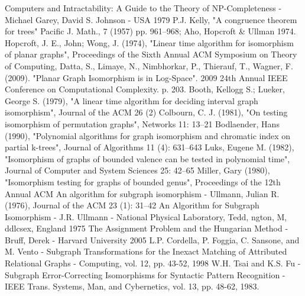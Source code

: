 \documentclass[a4paper,12pt,twoside]{article}
\begin{document}
\begin{thebibliography}{1}
 Computers and Intractability: A Guide to the Theory of NP-Completeness - Michael Garey, David S. Johnson - USA 1979
 P.J. Kelly, "A congruence theorem for trees" Pacific J. Math., 7 (1957) pp. 961–968; Aho, Hopcroft & Ullman 1974.
 Hopcroft, J. E., John; Wong, J. (1974), "Linear time algorithm for isomorphism of planar graphs", Proceedings of the Sixth Annual ACM Symposium on Theory of Computing, 
 Datta, S., Limaye, N., Nimbhorkar, P., Thierauf, T., Wagner, F. (2009). "Planar Graph Isomorphism is in Log-Space". 2009 24th Annual IEEE Conference on Computational Complexity. p. 203. 
 Booth, Kellogg S.; Lueker, George S. (1979), "A linear time algorithm for deciding interval graph isomorphism", Journal of the ACM 26 (2)
 Colbourn, C. J. (1981), "On testing isomorphism of permutation graphs", Networks 11: 13–21
 Bodlaender, Hans (1990), "Polynomial algorithms for graph isomorphism and chromatic index on partial k-trees", Journal of Algorithms 11 (4): 631–643
 Luks, Eugene M. (1982), "Isomorphism of graphs of bounded valence can be tested in polynomial time", Journal of Computer and System Sciences 25: 42–65
 Miller, Gary (1980), "Isomorphism testing for graphs of bounded genus", Proceedings of the 12th Annual ACM
 An algorithm for subgraph isomorphism - Ullmann, Julian R. (1976), Journal of the ACM 23 (1): 31–42
 An Algorithm for Subgraph Isomorphism - J.R. Ullmann - National Physical Laboratory, Tedd, ngton, M, ddlcsex, England 1975
 The Assignment Problem and the Hungarian Method - Bruff, Derek - Harvard University 2005
 L.P. Cordella, P. Foggia, C. Sansone, and M. Vento - Subgraph Transformations for the Inexact Matching of Attributed Relational Graphs - Computing, vol. 12, pp. 43-52, 1998
 W.H. Tsai and K.S. Fu - Subgraph Error-Correcting Isomorphisms for Syntactic Pattern Recognition - IEEE Trans. Systems, Man, and Cybernetics, vol. 13, pp. 48-62, 1983.
\end{thebibliography}

\newpage

\listoffigures

\newpage

\renewcommand*{\lstlistlistingname}{Spis listingów}
\lstlistoflistings
\end{document}

